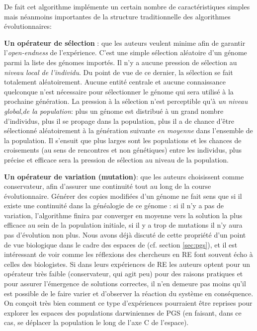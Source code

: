 De fait cet algorithme implémente un certain nombre de caractéristiques simples mais néanmoins importantes de la structure traditionnelle des algorithmes évolutionnaires:

\textbf{Un opérateur de sélection }: que les auteurs veulent minime afin de garantir l'\emph{open-endness} de l'expérience. C'est une simple sélection aléatoire d'un génome parmi la liste des génomes importés. Il n'y a aucune pression de sélection au \emph{niveau local de l'individu}. Du point de vue de ce dernier, la sélection se fait totalement aléatoirement. Aucune entité centrale et aucune connaissance quelconque n'est nécessaire pour sélectionner le génome qui sera utilisé à la prochaine génération. La pression à la sélection n'est perceptible qu'à \emph{un niveau global},\emph{de la population}: plus un génome est distribué à un grand nombre d'individus, plus il se propage dans la population, plus il a de chance d'être sélectionné aléatoirement à la génération suivante \emph{en moyenne} dans l'ensemble de la population. Il s'ensuit que plus larges sont les populations et les chances de croisements (au sens de rencontres et non génétiques) entre les individus, plus précise et efficace sera la pression de sélection au niveau de la population.

\textbf{Un opérateur de variation (mutation)}: que les auteurs choisissent comme conservateur, afin d'assurer une continuité tout au long de la course évolutionnaire. Générer des copies modifiées d'un génome ne fait sens que si il existe une continuité dans la généalogie de ce génome : si il n'y a pas de variation, l'algorithme finira par converger en moyenne vers la solution la plus efficace au sein de la population initiale, si il y a trop de mutations il n'y aura pas d'évolution non plus. Nous avons déjà discuté de cette propriété d'un point de vue biologique dans le cadre des espaces de \cite{godfrey2009darwinian} (cf. section \ref{sec:pgs}), et il est intéressant de voir comme les réflexions des chercheurs en RE font souvent écho à celles des biologistes. Si dans leurs expériences de RE les auteurs optent pour un opérateur très faible (conservateur, qui agit peu) pour des raisons pratiques et pour assurer l'émergence de solutions correctes, il n'en demeure pas moins qu'il est possible de le faire varier et d'observer la réaction du système en conséquence. On conçoit très bien comment ce type d'expériences pourraient être reprises pour explorer les espaces des populations darwiniennes de PGS (en faisant, dans ce cas, se déplacer la population le long de l'axe C de l'espace).

